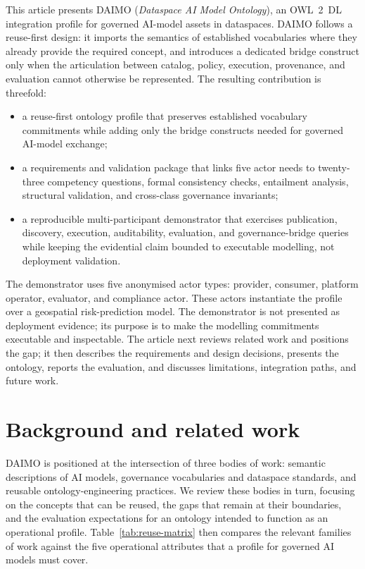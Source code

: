 \documentclass[Afour,sagev,times]{sagej}
\begin{document}
This article presents DAIMO (\emph{Dataspace AI Model Ontology}), an OWL~2~DL integration profile for governed AI-model assets in dataspaces. DAIMO follows a reuse-first design: it imports the semantics of established vocabularies where they already provide the required concept, and introduces a dedicated bridge construct only when the articulation between catalog, policy, execution, provenance, and evaluation cannot otherwise be represented. The resulting contribution is threefold:

\begin{itemize}[leftmargin=*]
\item a reuse-first ontology profile that preserves established vocabulary commitments while adding only the bridge constructs needed for governed AI-model exchange;
\item a requirements and validation package that links five actor needs to twenty-three competency questions, formal consistency checks, entailment analysis, structural validation, and cross-class governance invariants;
\item a reproducible multi-participant demonstrator that exercises publication, discovery, execution, auditability, evaluation, and governance-bridge queries while keeping the evidential claim bounded to executable modelling, not deployment validation.
\end{itemize}

The demonstrator uses five anonymised actor types: provider, consumer, platform operator, evaluator, and compliance actor. These actors instantiate the profile over a geospatial risk-prediction model. The demonstrator is not presented as deployment evidence; its purpose is to make the modelling commitments executable and inspectable. The article next reviews related work and positions the gap; it then describes the requirements and design decisions, presents the ontology, reports the evaluation, and discusses limitations, integration paths, and future work.


\section{Background and related work}\label{sec:related}

DAIMO is positioned at the intersection of three bodies of work: semantic descriptions of AI models, governance vocabularies and dataspace standards, and reusable ontology-engineering practices. We review these bodies in turn, focusing on the concepts that can be reused, the gaps that remain at their boundaries, and the evaluation expectations for an ontology intended to function as an operational profile. Table~\ref{tab:reuse-matrix} then compares the relevant families of work against the five operational attributes that a profile for governed AI models must cover.
\end{document}
